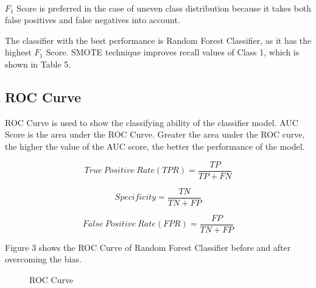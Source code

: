\documentclass[12pt,letterpaper]{article}
\begin{document}
        \paragraph{}
        
            $F_1$ Score is preferred in the case of uneven class distribution because it takes both false positives and  false negatives into account.
            
            The classifier with the best performance is Random Forest Classifier, as it has the highest $F_1$ Score. SMOTE technique improves recall values of Class 1, which is shown in Table 5.
            
        \subsection*{ROC Curve}
        
            ROC Curve is used to show the classifying ability of the classifier model. AUC Score is the area under the ROC Curve. Greater the area under the ROC curve, the higher the value of the AUC score, the better the performance of the model.
            
            \[True\ Positive\ Rate(TPR) = \frac{TP}{TP + FN}\]
            
            \[Specificity = \frac{TN}{TN + FP}\]
            
            \[False\ Positive\ Rate(FPR) = \frac{FP}{TN + FP}\]
   
             
            Figure 3 shows the ROC Curve of Random Forest Classifier before and after  overcoming the bias.
        
            \begin{figure}[H]%
                \centering
                \qquad
                \caption{ROC Curve}%
            \end{figure}
        
\end{document}
